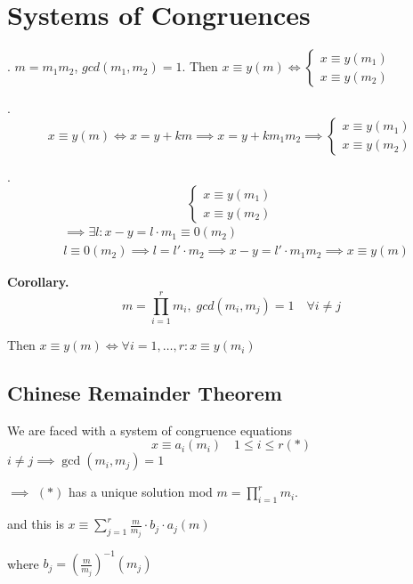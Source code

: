 \section{Systems of Congruences}

\Theorem.
$m = m_1 m_2$, $gcd(m_1, m_2) = 1$. Then $x \equiv y (m) \iff \begin{cases} x \equiv y (m_1) \\ x \equiv y (m_2) \end{cases}$

\ProofForward.
\[
  x \equiv y (m) \iff x = y + km \implies x = y + k m_1 m_2 \implies
  \begin{cases}
    x \equiv y (m_1) \\
    x \equiv y (m_2)
  \end{cases}
\]

\ProofBackward.
\[
  \begin{cases}
    x \equiv y (m_1) \\
    x \equiv y (m_2)
  \end{cases}
\]
\begin{align*}
  & \implies \exists l: x-y = l\cdot m_1 \equiv 0 (m_2)\\
  & l \equiv 0 (m_2) \implies l = l' \cdot m_2
    \implies x-y = l'\cdot m_1 m_2
    \implies x \equiv y (m)
\end{align*}

\textbf{Corollary.}
\[
  m = \prod_{i=1}^r m_i,\; gcd(m_i, m_j) = 1 \quad \forall i \neq j
\]

Then $x \equiv y (m) \iff \forall i = 1, \ldots, r : x \equiv y (m_i)$

\subsection{Chinese Remainder Theorem}
We are faced with a system of congruence equations
\[
  x \equiv a_i (m_i) \quad 1 \leq i \leq r (*)
\]
$i \neq j \implies \gcd(m_i, m_j) = 1$

$\implies$ $(*)$ has a unique solution mod $\displaystyle{m = \prod_{i = 1}^r m_i}$.

and this is $\displaystyle{x \equiv \sum_{j=1}^r \frac {m}{m_j} \cdot b_j \cdot a_j (m)}$

where $b_j = \left( \frac{m}{m_j} \right) ^{-1} (m_j)$
